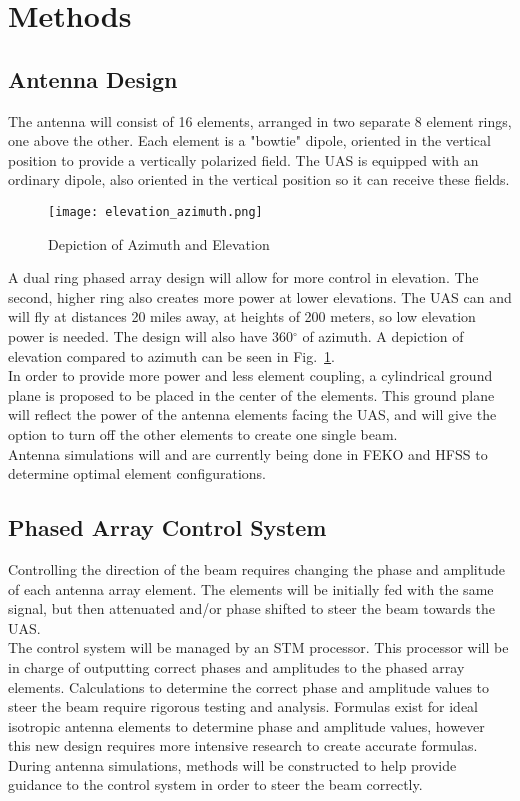 \documentclass[UROP.tex]{subfiles}
\begin{document}
\bigskip
\section{\Large Methods}
\subsection{Antenna Design}
	The antenna will consist of 16 elements, arranged in two separate 8 element rings, one above the other.  Each element is a "bowtie" dipole, oriented in the vertical position to provide a vertically polarized field.  The UAS is equipped with an ordinary dipole, also oriented in the vertical position so it can receive these fields.  
	
	\begin{figure}[H]
		\centering
		\texttt{[image: elevation\_azimuth.png]}
		\caption{ Depiction of Azimuth and Elevation \label{fig:elevation_azimuth}}
	\end{figure}
	
	A dual ring phased array design will allow for more control in elevation.  The second, higher ring also creates more power at lower elevations.  The UAS can and will fly at distances 20 miles away, at heights of 200 meters, so low elevation power is needed.  The design will also have 360$^{\circ}$ of azimuth.  A depiction of elevation compared to azimuth can be seen in Fig.~\ref{fig:elevation_azimuth}. \\
	
	In order to provide more power and less element coupling, a cylindrical ground plane is proposed to be placed in the center of the elements. This ground plane will reflect the power of the antenna elements facing the UAS, and will give the option to turn off the other elements to create one single beam.\\
	
	Antenna simulations will and are currently being done in FEKO and HFSS to determine optimal element configurations.
\subsection{Phased Array Control System}
	Controlling the direction of the beam requires changing the phase and amplitude of each antenna array element.  The elements will be initially fed with the same signal, but then attenuated and/or phase shifted to steer the beam towards the UAS.  \\
	
	The control system will be managed by an STM processor.  This processor will be in charge of outputting correct phases and amplitudes to the phased array elements.  Calculations to determine the correct phase and amplitude values to steer the beam require rigorous testing and analysis.  Formulas exist for ideal isotropic antenna elements to determine phase and amplitude values, however this new design requires more intensive research to create accurate formulas.  During antenna simulations, methods will be constructed to help provide guidance to the control system in order to steer the beam correctly. \\
	
\end{document}
